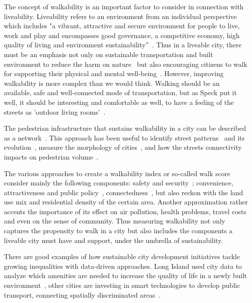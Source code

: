 The concept of walkability is an important factor to consider in connection with liveability. Liveability refers to an environment from an individual perspective~\cite{Heylen2006Liveability} which includes "a vibrant, attractive and secure environment for people to live, work and play and encompasses good governance, a competitive economy, high quality of living and environment sustainability”~\cite{Shamsuddin2012Walkable}. Thus in a liveable city, there must be an emphasis not only on sustainable transportation and built environment to reduce the harm on nature~\cite{Campbell1996Green,Jabareen2013Planning} but also encouraging citizens to walk for supporting their physical and mental well-being~\cite{Frank2006Many}. However, improving walkability is more complex than we would think. Walking should be an available, safe and well-connected mode of transportation, but as Speck put it well, it should be interesting and comfortable as well, to have a feeling of the streets as ’outdoor living rooms’~\cite{Speck2012Walkability}.

The pedestrian infrastructure that sustains walkability in a city can be described as a network~\cite{porta2006primal}. This approach has been useful to identify street patterns~\cite{barthelemy2008patterns,louf2014typology} and its evolution~\cite{strano2012evolution,Barthelemy2013Evolution}, measure the morphology of cities~\cite{Boeing2019Morphology}, and how the streets connectivity impacts on pedestrian volume~\cite{Hajrasouliha2015Impact}.

The various approaches to create a walkability index or so-called walk score consider mainly the following components: safety and security~\cite{Quercia2015Digital,Silva2018Investigating}; convenience, attractiveness and public policy~\cite{Krambeck2006Global,Speck2012Walkability}, connectedness~\cite{Southworth2005Designing}, but also reckon with the land use mix and residential density of the certain area\cite{Carr2010Walk}. Another approximation rather accents the importance of its effect on air pollution, health problems, travel costs and even on the sense of community\cite{Stephen2014Sustainable}. Thus measuring walkability not only captures the propensity to walk in a city but also includes the components a liveable city must have and support, under the umbrella of sustainability.

There are good examples of how sustainable city development initiatives tackle growing inequalities with data-driven approaches. Long Island used city data to analyze which amenities are needed to increase the quality of life in a newly built environment~\cite{Childs2018Planning}, other cities are investing in smart technologies to develop public transport, connecting spatially discriminated areas~\cite{Kaushik2017Planning,Fitzgerald2016Data}.

